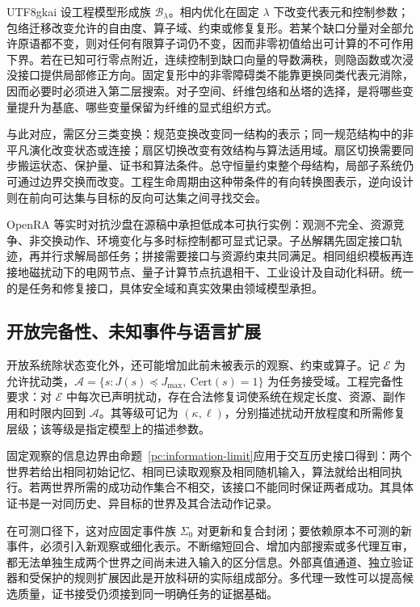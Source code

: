 \documentclass[11pt,a4paper]{article}
\theoremstyle{plain}
\theoremstyle{definition}
\theoremstyle{remark}
\begin{document}
\begin{CJK*}{UTF8}{gkai}
设工程模型形成族 $\mathcal B_\lambda$。相内优化在固定 $\lambda$ 下改变代表元和控制参数；包络迁移改变允许的自由度、算子域、约束或修复复形。若某个缺口分量对全部允许原语都不变，则对任何有限算子词仍不变，因而非零初值给出可计算的不可作用下界。若在已知可行零点附近，连续控制到缺口向量的导数满秩，则隐函数或次浸没接口提供局部修正方向。固定复形中的非零障碍类不能靠更换同类代表元消除，因而必要时必须进入第二层搜索。对子空间、纤维包络和丛塔的选择，是将哪些变量提升为基底、哪些变量保留为纤维的显式组织方式。\cite{S13,S14}

与此对应，需区分三类变换：规范变换改变同一结构的表示；同一规范结构中的非平凡演化改变状态或连接；扇区切换改变有效结构与算法适用域。扇区切换需要同步搬运状态、保护量、证书和算法条件。总守恒量约束整个母结构，局部子系统仍可通过边界交换而改变。工程生命周期由这种带条件的有向转换图表示，逆向设计则在前向可达集与目标的反向可达集之间寻找交会。

OpenRA 等实时对抗沙盘在源稿中承担低成本可执行实例：观测不完全、资源竞争、非交换动作、环境变化与多时标控制都可显式记录。子丛解耦先固定接口轨迹，再并行求解局部任务；拼接需要接口与资源约束共同满足。相同组织模板再连接地磁扰动下的电网节点、量子计算节点抗退相干、工业设计及自动化科研。统一的是任务和修复接口，具体安全域和真实效果由领域模型承担。\cite{S14,S16}

\subsection{开放完备性、未知事件与语言扩展}

开放系统除状态变化外，还可能增加此前未被表示的观察、约束或算子。记 $\mathcal E$ 为允许扰动类，$\mathcal A=\{s:J(s)\preceq J_{\max},\ \mathrm{Cert}(s)=1\}$ 为任务接受域。工程完备性要求：对 $\mathcal E$ 中每次已声明扰动，存在合法修复词使系统在规定长度、资源、副作用和时限内回到 $\mathcal A$。其等级可记为 $(\kappa,\ell)$，分别描述扰动开放程度和所需修复层级；该等级是指定模型上的描述参数。\cite{S15}

固定观察的信息边界由命题~\ref{pc:information-limit}应用于交互历史接口得到：两个世界若给出相同初始记忆、相同已读取观察及相同随机输入，算法就给出相同执行。若两世界所需的成功动作集合不相交，该接口不能同时保证两者成功。其具体证书是一对同历史、异目标的世界及其合法动作记录。

在可测口径下，这对应固定事件族 $\Sigma_0$ 对更新和复合封闭；要依赖原本不可测的新事件，必须引入新观察或细化表示。不断缩短回合、增加内部搜索或多代理互审，都无法单独生成两个世界之间尚未进入输入的区分信息。外部真值通道、独立验证器和受保护的规则扩展因此是开放科研的实际组成部分。多代理一致性可以提高候选质量，证书接受仍须接到同一明确任务的证据基础。\cite{S14,S15,S16}


\end{CJK*}
\end{document}
